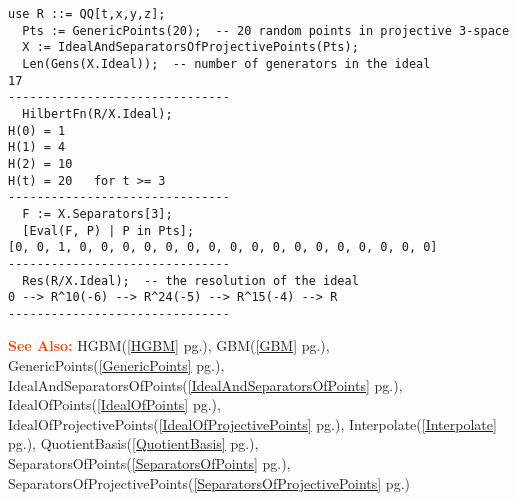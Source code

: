 \documentclass[a4paper]{mybook}
\newenvironment{command}{}{} %
\newcommand\SeeAlso{\par\textcolor{OrangeRed}{\textbf{\large See Also: }}}
\begin{document}
\begin{command}
\begin{Verbatim}[label=example, rulecolor=\color{PineGreen}, frame=single]
  use R ::= QQ[t,x,y,z];
  Pts := GenericPoints(20);  -- 20 random points in projective 3-space
  X := IdealAndSeparatorsOfProjectivePoints(Pts);
  Len(Gens(X.Ideal));  -- number of generators in the ideal
17
-------------------------------
  HilbertFn(R/X.Ideal);
H(0) = 1
H(1) = 4
H(2) = 10
H(t) = 20   for t >= 3
-------------------------------
  F := X.Separators[3];
  [Eval(F, P) | P in Pts];
[0, 0, 1, 0, 0, 0, 0, 0, 0, 0, 0, 0, 0, 0, 0, 0, 0, 0, 0, 0]
-------------------------------
  Res(R/X.Ideal);  -- the resolution of the ideal
0 --> R^10(-6) --> R^24(-5) --> R^15(-4) --> R
-------------------------------
\end{Verbatim}


\SeeAlso %
  HGBM(\ref{HGBM} pg.\pageref{HGBM}), 
    GBM(\ref{GBM} pg.\pageref{GBM}), 
    GenericPoints(\ref{GenericPoints} pg.\pageref{GenericPoints}), 
    IdealAndSeparatorsOfPoints(\ref{IdealAndSeparatorsOfPoints} pg.\pageref{IdealAndSeparatorsOfPoints}), 
    IdealOfPoints(\ref{IdealOfPoints} pg.\pageref{IdealOfPoints}), 
    IdealOfProjectivePoints(\ref{IdealOfProjectivePoints} pg.\pageref{IdealOfProjectivePoints}), 
    Interpolate(\ref{Interpolate} pg.\pageref{Interpolate}), 
    QuotientBasis(\ref{QuotientBasis} pg.\pageref{QuotientBasis}), 
    SeparatorsOfPoints(\ref{SeparatorsOfPoints} pg.\pageref{SeparatorsOfPoints}), 
    SeparatorsOfProjectivePoints(\ref{SeparatorsOfProjectivePoints} pg.\pageref{SeparatorsOfProjectivePoints})
\end{command} %
\end{document}
